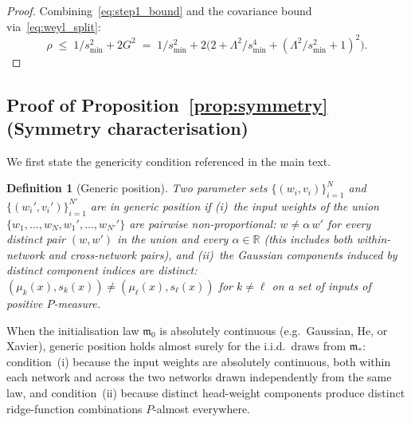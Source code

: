 \documentclass[11pt]{article}
\newtheorem{definition}[theorem]{Definition}
\newcommand{\R}{\mathbb{R}}
\begin{document}
\begin{proof}
Combining~\eqref{eq:step1_bound} and the covariance bound via~\eqref{eq:weyl_split}:
\begin{equation}\label{eq:rho_bound}
  \rho \;\le\; 1/s_{\min}^2 + 2G^2
  \;=\; 1/s_{\min}^2 + 2\bigl(2 + \Lambda^2/s_{\min}^4
  + (\Lambda^2/s_{\min}^2+1)^2\bigr).
\end{equation}
\end{proof}

\subsection{Proof of Proposition~\ref{prop:symmetry}
  (Symmetry characterisation)}\label{app:proof_symmetry}

We first state the genericity condition referenced in the main text.

\begin{definition}[Generic position]\label{def:generic}
Two parameter sets $\{(w_i, v_i)\}_{i=1}^N$ and
$\{(w_i', v_i')\}_{i=1}^{N'}$ are in \emph{generic position}
if (i)~the input weights of the \emph{union}
$\{w_1,\ldots,w_N,w_1',\ldots,w_{N'}'\}$
are pairwise non-proportional:
$w \ne \alpha\, w'$ for every distinct pair $(w,w')$ in the union
and every $\alpha \in \R$
(this includes both within-network and cross-network pairs),
and (ii)~the Gaussian components induced by distinct component indices
are distinct:
$(\mu_k(x), s_k(x)) \ne (\mu_\ell(x), s_\ell(x))$ for $k \ne \ell$
on a set of inputs of positive $P$-measure.
\end{definition}

When the initialisation law $\mathfrak{m}_0$ is absolutely continuous
(e.g.\ Gaussian, He, or Xavier), generic position holds almost
surely for the i.i.d.\ draws from $\mathfrak{m}_*$:
condition~(i) because the input weights are
absolutely continuous, both within each network and across the two
networks drawn independently from the same law,
and condition~(ii) because distinct head-weight
components produce distinct ridge-function combinations
$P$-almost everywhere.
\end{document}

